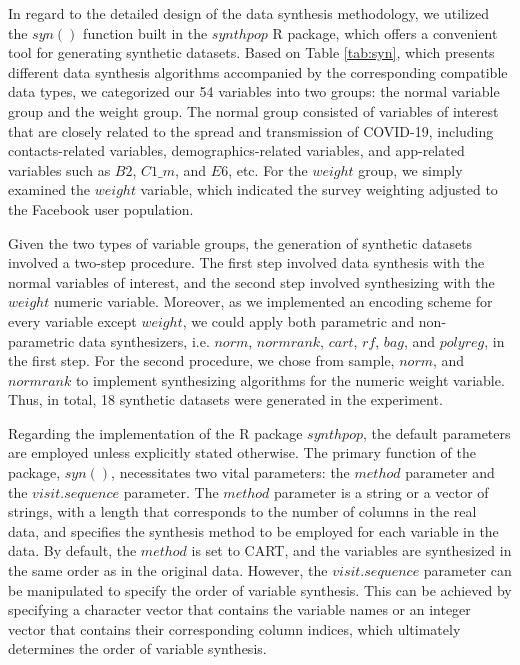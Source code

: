 In regard to the detailed design of the data synthesis methodology, we utilized the $syn()$ function built in the $synthpop$ R package, which offers a convenient tool for 
generating synthetic datasets. Based on Table \ref{tab:syn}, which presents different data synthesis algorithms accompanied by the corresponding compatible data types, we categorized our 
54 variables into two groups: the normal variable group and the weight group. The normal group consisted of variables of interest that are closely related to the spread and transmission of 
COVID-19, including contacts-related variables, demographics-related variables, and app-related variables such as $B2$, $C1\_m$, and $E6$, etc. For the $weight$ group, 
we simply examined the $weight$ variable, which indicated the survey weighting adjusted to the Facebook user population.

Given the two types of variable groups, the generation of synthetic datasets involved a two-step procedure. The first step involved data synthesis with the normal variables of interest, and the 
second step involved synthesizing with the $weight$ numeric variable. Moreover, as we implemented an encoding scheme for every variable except $weight$, we could apply both parametric and 
non-parametric data synthesizers, i.e.  $norm$, $normrank$, $cart$, $rf$, $bag$, and $polyreg$, in the first step. For the second procedure, we chose from sample, $norm$, and $normrank$ to 
implement synthesizing algorithms for the numeric weight variable. Thus, in total, 18 synthetic datasets were generated in the experiment.

Regarding the implementation of the R package $synthpop$, the default parameters are employed unless explicitly stated otherwise. The primary function of the package, $syn()$, necessitates two vital parameters: the $method$ parameter and the $visit.sequence$ parameter. The $method$ parameter is a string or a vector of strings, with a length that corresponds to the number of columns in the real data, and specifies the synthesis method to be employed for each variable in the data. By default, the $method$ is set to CART, and the variables are synthesized in the same order as in the original data. However, the $visit.sequence$ parameter can be manipulated to specify the order of variable synthesis. This can be achieved by specifying a character vector that contains the variable names or an integer vector that contains their corresponding column indices, which ultimately determines the order of variable synthesis.

